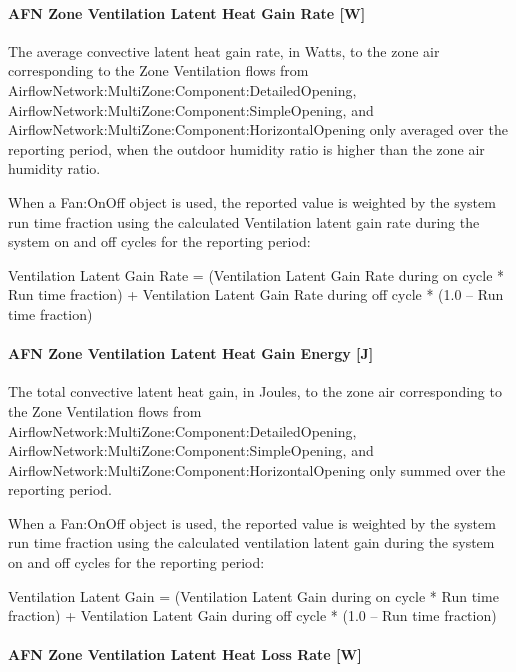 \paragraph{AFN Zone Ventilation Latent Heat Gain Rate {[}W{]}}\label{afn-zone-ventilation-latent-heat-gain-rate-w}

The average convective latent heat gain rate, in Watts, to the zone air corresponding to the Zone Ventilation flows from AirflowNetwork:MultiZone:Component:DetailedOpening, AirflowNetwork:MultiZone:Component:SimpleOpening, and AirflowNetwork:MultiZone:Component:HorizontalOpening only averaged over the reporting period, when the outdoor humidity ratio is higher than the zone air humidity ratio.

When a Fan:OnOff object is used, the reported value is weighted by the system run time fraction using the calculated Ventilation latent gain rate during the system on and off cycles for the reporting period:

Ventilation Latent Gain Rate = (Ventilation Latent Gain Rate during on cycle * Run time fraction) + Ventilation Latent Gain Rate during off cycle * (1.0 -- Run time fraction)

\paragraph{AFN Zone Ventilation Latent Heat Gain Energy {[}J{]}}\label{afn-zone-ventilation-latent-heat-gain-energy-j}

The total convective latent heat gain, in Joules, to the zone air corresponding to the Zone Ventilation flows from AirflowNetwork:MultiZone:Component:DetailedOpening, AirflowNetwork:MultiZone:Component:SimpleOpening, and AirflowNetwork:MultiZone:Component:HorizontalOpening only  summed over the reporting period.

When a Fan:OnOff object is used, the reported value is weighted by the system run time fraction using the calculated ventilation latent gain during the system on and off cycles for the reporting period:

Ventilation Latent Gain = (Ventilation Latent Gain during on cycle * Run time fraction) + Ventilation Latent Gain during off cycle * (1.0 -- Run time fraction)

\paragraph{AFN Zone Ventilation Latent Heat Loss Rate {[}W{]}}\label{afn-zone-ventilation-latent-heat-loss-rate-w}

